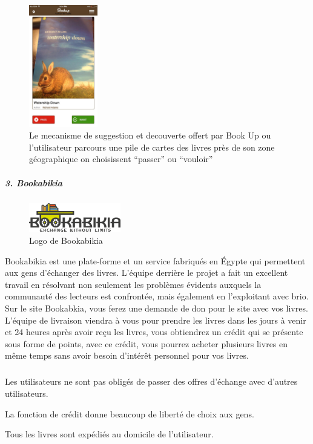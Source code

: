 \begin{figure}[h]
	\begin{center}
		\includegraphics[width=3cm]{Images/chapter1/bookUpScreenshot.jpg}
		\caption{\footnotesize {Le mecanisme de suggestion et decouverte offert par Book Up ou l'utilisateur parcours une pile de cartes des livres près de son zone géographique on choisissent “passer” ou “vouloir”}}
	\end{center}
\end{figure}
\newpage

\subparagraph{{\large 3. Bookabikia\medskip \\}}

\begin{figure}
	\vspace{25pt}
	\includegraphics[width=4cm]{Images/chapter1/bookabikiaLogo.png}
	\vspace{-20pt}
	\caption{{\footnotesize Logo de Bookabikia}}
\end{figure}

Bookabikia est une plate-forme et un service fabriqués en Égypte qui permettent aux gens d'échanger des livres. L'équipe derrière le projet a fait un excellent travail en résolvant non seulement les problèmes évidents auxquels la communauté des lecteurs est confrontée, mais également en l'exploitant avec brio. Sur le site Bookabkia, vous ferez une demande de don pour le site avec vos livres. L’équipe de livraison viendra à vous pour prendre les livres dans les jours à venir et 24 heures après avoir reçu les livres, vous obtiendrez un crédit qui se présente sous forme de points, avec ce crédit, vous pourrez acheter plusieurs livres en même temps sans avoir besoin d’intérêt personnel pour vos livres.\cite{noauthor_bookabikia_nodate}

\subparagraph*{}
\begin{list}{•}{\textbf{Avantages}}
	\item Les utilisateurs ne sont pas obligés de passer des offres d'échange avec d'autres utilisateurs.
	\item La fonction de crédit donne beaucoup de liberté de choix aux gens.
	\item Tous les livres sont expédiés au domicile de l'utilisateur.
\end{list}

